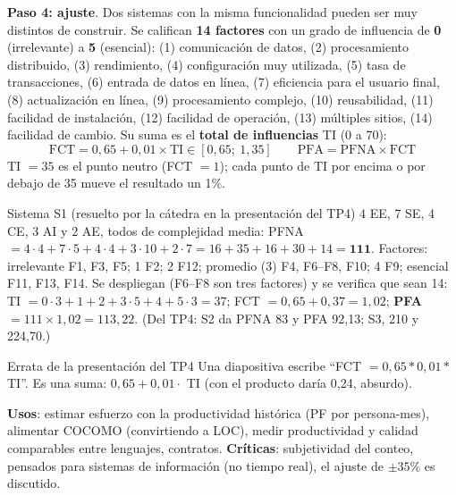 \documentclass[11pt,a4paper]{article}
\begin{document}
\textbf{Paso 4: ajuste}. Dos sistemas con la misma funcionalidad pueden ser muy distintos de construir. Se
califican \textbf{14 factores} con un grado de influencia de \textbf{0} (irrelevante) a \textbf{5} (esencial):
(1) comunicación de datos, (2) procesamiento distribuido, (3) rendimiento, (4) configuración muy utilizada,
(5) tasa de transacciones, (6) entrada de datos en línea, (7) eficiencia para el usuario final, (8)
actualización en línea, (9) procesamiento complejo, (10) reusabilidad, (11) facilidad de instalación, (12)
facilidad de operación, (13) múltiples sitios, (14) facilidad de cambio. Su suma es el \textbf{total de
influencias} TI (0 a 70):
\[ \boxed{\text{FCT} = 0{,}65 + 0{,}01 \times \text{TI}} \in [0{,}65;\ 1{,}35] \qquad \boxed{\text{PFA} = \text{PFNA} \times \text{FCT}} \]
TI $= 35$ es el punto neutro (FCT $=1$); cada punto de TI por encima o por debajo de 35 mueve el resultado un 1\%.

\begin{ejemplo}{Sistema S1 (resuelto por la cátedra en la presentación del TP4)}
4 EE, 7 SE, 4 CE, 3 AI y 2 AE, todos de complejidad media:
PFNA $= 4 \cdot 4 + 7 \cdot 5 + 4 \cdot 4 + 3 \cdot 10 + 2 \cdot 7 = 16 + 35 + 16 + 30 + 14 = \mathbf{111}$.
Factores: irrelevante F1, F3, F5; 1 F2; 2 F12; promedio (3) F4, F6--F8, F10; 4 F9; esencial F11, F13, F14. Se
despliegan (F6--F8 son tres factores) y se verifica que sean 14: TI $= 0 \cdot 3 + 1 + 2 + 3 \cdot 5 + 4 + 5 \cdot
3 = 37$; FCT $= 0{,}65 + 0{,}37 = 1{,}02$; \textbf{PFA $= 111 \times 1{,}02 = 113{,}22$}. (Del TP4: S2 da PFNA 83 y
PFA 92,13; S3, 210 y 224,70.)
\end{ejemplo}
\begin{aviso}{Errata de la presentación del TP4}
Una diapositiva escribe ``FCT $= 0{,}65 * 0{,}01 *$ TI''. Es una suma: $0{,}65 + 0{,}01 \cdot$ TI (con el
producto daría 0,24, absurdo).
\end{aviso}
\textbf{Usos}: estimar esfuerzo con la productividad histórica (PF por persona-mes), alimentar COCOMO
(convirtiendo a LOC), medir productividad y calidad comparables entre lenguajes, contratos. \textbf{Críticas}:
subjetividad del conteo, pensados para sistemas de información (no tiempo real), el ajuste de $\pm 35\%$ es
discutido.
\end{document}
